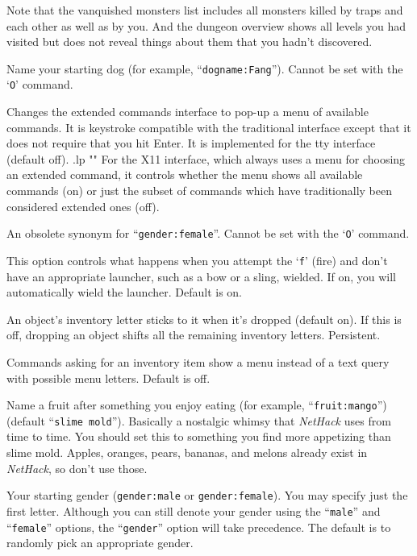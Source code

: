 Note that the vanquished monsters list includes all monsters killed by
traps and each other as well as by you.
And the dungeon overview shows all levels you had visited but does not
reveal things about them that you hadn't discovered.
\item[\ib{dogname}]
Name your starting dog (for example, ``{\tt dogname:Fang}'').
Cannot be set with the `{\tt O}' command.
\item[\ib{extmenu}]
Changes the extended commands interface to pop-up a menu of available commands.
It is keystroke compatible with the traditional interface except that it does
not require that you hit Enter.
It is implemented for the tty interface (default off).
.lp ""
For the X11 interface, which always uses a menu for choosing an extended
command, it controls whether the menu shows all available commands (on)
or just the subset of commands which have traditionally been considered
extended ones (off).
\item[\ib{female}]
An obsolete synonym for ``{\tt gender:female}''.  Cannot be set with the
`{\tt O}' command.
\item[\ib{fireassist}]
This option controls what happens when you attempt the `{\tt f}' (fire)
and don't have an appropriate launcher, such as a bow or a sling, wielded.
If on, you will automatically wield the launcher. Default is on.
\item[\ib{fixinv}]
An object's inventory letter sticks to it when it's dropped (default on).
If this is off, dropping an object shifts all the remaining inventory letters.
Persistent.
\item[\ib{force\_invmenu}]
Commands asking for an inventory item show a menu instead of
a text query with possible menu letters. Default is off.
\item[\ib{fruit}]
Name a fruit after something you enjoy eating (for example, ``{\tt fruit:mango}'')
(default ``{\tt slime mold}''). Basically a nostalgic whimsy that
{\it NetHack\/} uses from time to time.  You should set this to something you
find more appetizing than slime mold.  Apples, oranges, pears, bananas, and
melons already exist in {\it NetHack\/}, so don't use those.
\item[\ib{gender}]
Your starting gender ({\tt gender:male} or {\tt gender:female}).
You may specify just the first letter.  Although you can
still denote your gender using the ``{\tt male}'' and ``{\tt female}''
options, the ``{\tt gender}'' option will take precedence.
The default is to randomly pick an appropriate gender.
